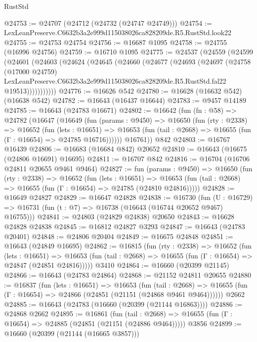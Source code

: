 \begin{lexlean}{RustStd}
\begin{coremodule}
@24753 := @24707 (@24712 (@24732 (@24747 @24749)))
@24754 := LexLeanPreserve.C6632b3a2e999d115038026ca828209de.R5.RustStd.look22
@24755 := @24753 @24754
@24756 := @16687 @1095
@24758 := @24755 (@16996 @24756)
@24759 := @16710 @1095
@24775 := @24537
    (@24559
      (@24599
        (@24601
          (@24603
            (@24624
              (@24645
                (@24660
                  (@24677
                    (@24693
                      (@24697
                        (@24758
                          (@17000 @24759)
                          LexLeanPreserve.C6632b3a2e999d115038026ca828209de.R5.RustStd.fal22
                          @19513)))))))))))
@24776 := @16626 @542
@24780 := @16628 (@16632 @542) (@16638 @542)
@24782 := @16643 (@16437 @16644)
@24783 := @9457 @14189
@24785 := @16643 (@24783 @16671)
@24802 := @16642
    (fun (fn : @58) =>
    @24782
      (@16647
        (@16649
          (fun (params : @9450) =>
          @16650
            (fun (rty : @2338) =>
            @16652
              (fun (lets : @16651) =>
              @16653 (fun (tail : @2668) => @16655 (fun (Γ : @16654) => @24785 @16716))))))
        @16761))
    @842
@24803 := @16767 @16439
@24806 := @16683 (@16684 @842) @20652
@24810 := @16643 (@16675 (@24806 @16691) @16695)
@24811 := @16707 @842
@24816 := @16704 (@16706 @24811 @20655 @9461 @9464)
@24827 := fun (params : @9450) =>
  @16650
    (fun (rty : @2338) =>
    @16652
      (fun (lets : @16651) =>
      @16653 (fun (tail : @2668) => @16655 (fun (Γ : @16654) => @24785 (@24810 @24816)))))
@24828 := @16649 @24827
@24829 := @16647 @24828
@24838 := @16730
    (fun (U : @16729) => @16731 (fun (t : @7) => @16738 (@16643 (@16744 @20652 @9467) @16755)))
@24841 := @24803 (@24829 @24838) @20650
@24843 := @16628 @24828 @24838
@24845 := @16812 @24827 @3293
@24847 := @16643 (@24783 @20401)
@24848 := @24806 @20404
@24849 := @16675 @24848
@24851 := @16643 (@24849 @16695)
@24862 := @16815
    (fun (rty : @2338) =>
    @16652
      (fun (lets : @16651) =>
      @16653 (fun (tail : @2668) => @16655 (fun (Γ : @16654) => @24847 (@24851 @24816)))))
    @3410
@24864 := @16660 (@20399 @21145)
@24866 := @16643 (@24783 @24864)
@24868 := @21152 @24811 @20655
@24880 := @16837
    (fun (lets : @16651) =>
    @16653
      (fun (tail : @2668) =>
      @16655 (fun (Γ : @16654) => @24866 (@24851 (@21151 (@24868 @9461 @9464))))))
    @2662
@24885 := @16643 (@24783 (@16660 (@20399 (@21144 @16863))))
@24886 := @24868 @2662
@24895 := @16861
    (fun (tail : @2668) => @16655 (fun (Γ : @16654) => @24885 (@24851 (@21151 (@24886 @9464)))))
    @3856
@24899 := @16660 (@20399 (@21144 (@16665 @3857)))

\end{coremodule}
\end{lexlean}
